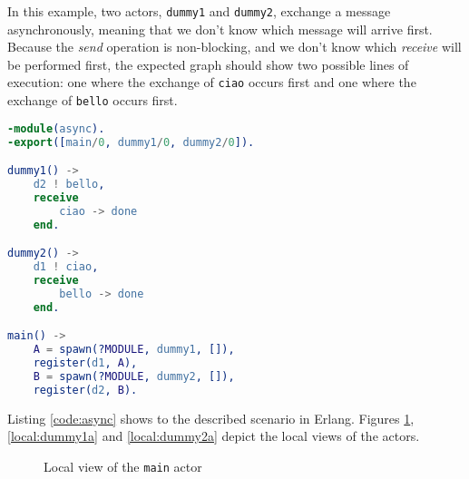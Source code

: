 \begin{exmp}
In this example, two actors, \texttt{dummy1} and \texttt{dummy2}, exchange a 
message asynchronously, meaning that we don't know which message will arrive 
first. Because the \textit{send} operation is non-blocking, and we don't know 
which \textit{receive} will be performed first, the expected graph should show 
two possible lines of execution: one where the exchange of \texttt{ciao} occurs 
first and one where the exchange of \texttt{bello} occurs first.

\begin{lstlisting}[language=Erlang, caption=Two processes exchanging messages 
asynchronously, label=code:async]
-module(async).
-export([main/0, dummy1/0, dummy2/0]).

dummy1() ->
    d2 ! bello,
    receive
        ciao -> done
    end.

dummy2() ->
    d1 ! ciao,
    receive
        bello -> done
    end.

main() ->
    A = spawn(?MODULE, dummy1, []),
    register(d1, A),
    B = spawn(?MODULE, dummy2, []),
    register(d2, B).
\end{lstlisting}

Listing \ref{code:async} shows to the described scenario in Erlang. Figures 
\ref{local:main}, \ref{local:dummy1a} and \ref{local:dummy2a} depict the local
views of the actors.

\begin{figure}[!ht]
    \centering
    \caption{Local view of the \texttt{main} actor}
    \label{local:main}
\end{figure}

\begin{figure}[!ht]
    \centering
\end{figure}
\end{exmp}

